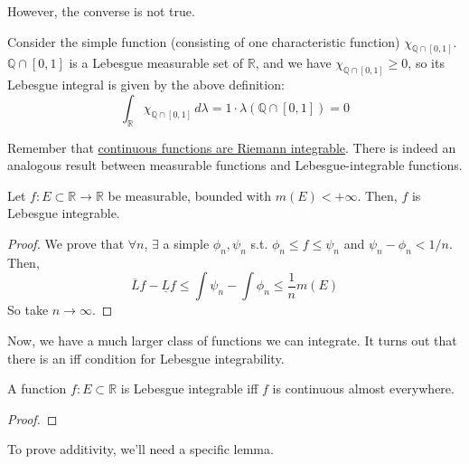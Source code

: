   However, the converse is not true. 

  \begin{example}
    Consider the simple function (consisting of one characteristic function) $\chi_{\mathbb{Q} \cap [0, 1]}$. $\mathbb{Q} \cap [0, 1]$ is a Lebesgue measurable set of $\mathbb{R}$, and we have $\chi_{\mathbb{Q} \cap [0, 1]} \geq 0$, so its Lebesgue integral is given by the above definition: 
    \begin{equation}
      \int_{\mathbb{R}} \chi_{\mathbb{Q} \cap [0, 1]} \, d\lambda = 1 \cdot \lambda(\mathbb{Q} \cap [0, 1]) = 0
    \end{equation}
  \end{example} 

  Remember that \hyperref[real-thm:continuous-riemann]{continuous functions are Riemann integrable}. There is indeed an analogous result between measurable functions and Lebesgue-integrable functions. 

  \begin{theorem}
    Let $f: E \subset \mathbb{R} \to \mathbb{R}$ be measurable, bounded with $m(E) < +\infty$. Then, $f$ is Lebesgue integrable. 
  \end{theorem}
  \begin{proof}
    We prove that $\forall n$, $\exists$ a simple $\phi_n, \psi_n$ s.t. $\phi_n \leq f \leq \psi_n$  and $\psi_n - \phi_n < 1/n$. Then, 
    \begin{equation}
      \overline{L} f - \underline{L} f \leq \int \psi_n - \int \phi_n \leq \frac{1}{n} m(E)
    \end{equation}
    So take $n \to \infty$. 
  \end{proof}

  Now, we have a much larger class of functions we can integrate. It turns out that there is an iff condition for Lebesgue integrability. 

  \begin{theorem}
    A function $f: E \subset \mathbb{R}$ is Lebesgue integrable iff $f$ is continuous almost everywhere. 
  \end{theorem}
  \begin{proof}
    
  \end{proof} 

  To prove additivity, we'll need a specific lemma. 

